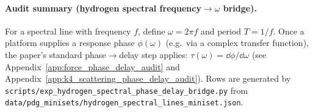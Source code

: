 \paragraph{Audit summary (hydrogen spectral frequency$\to\omega$ bridge).} \AuditTag For a spectral line with frequency $f$, define $\omega=2\pi f$ and period $T=1/f$. Once a platform supplies a response phase $\phi(\omega)$ (e.g.\ via a complex transfer function), the paper's standard phase$\to$delay step applies: $\tau(\omega)=\dd\phi/\dd\omega$ (see Appendix~\ref{app:force_phase_delay_audit} and Appendix~\ref{app:k4_scattering_phase_delay_audit}). Rows are generated by \texttt{scripts/exp\_hydrogen\_spectral\_phase\_delay\_bridge.py} from \texttt{data/pdg\_minisets/hydrogen\_spectral\_lines\_miniset.json}.